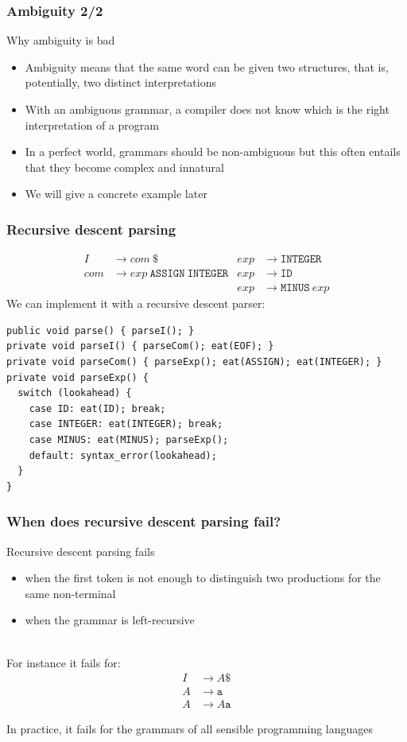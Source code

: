\documentclass[11pt]{beamer}  %
\begin{document}
\begin{frame}\frametitle{Ambiguity 2/2}

\begin{pinkbox}{Why ambiguity is bad}
\begin{itemize}
\item Ambiguity means that the same word can be given two structures, that is, potentially,
      two distinct interpretations
\item With an ambiguous grammar, a compiler does not know which is the right interpretation of a program
\item In a perfect world, grammars should be non-ambiguous but this often entails that they become
      complex and innatural
\item We will give a concrete example later
\end{itemize}
\end{pinkbox}

\end{frame}

\begin{frame}[fragile]\frametitle{Recursive descent parsing}
%
\begin{align*}
  \mathit{I}&\to\mathit{com}\ \mathtt{\$} & \mathit{exp}&\to\mathtt{INTEGER}\\
  \mathit{com}&\to\mathit{exp}\ \mathtt{ASSIGN}\ \mathtt{INTEGER} & \mathit{exp}&\to\mathtt{ID}\\
  && \mathit{exp}&\to\mathtt{MINUS}\ \mathit{exp}
\end{align*}
%
We can implement it with a recursive descent parser:
%
\begin{verbatim}
public void parse() { parseI(); }
private void parseI() { parseCom(); eat(EOF); }
private void parseCom() { parseExp(); eat(ASSIGN); eat(INTEGER); }
private void parseExp() {
  switch (lookahead) {
    case ID: eat(ID); break;
    case INTEGER: eat(INTEGER); break;
    case MINUS: eat(MINUS); parseExp();
    default: syntax_error(lookahead);
  }
}
\end{verbatim}
\end{frame}

\begin{frame}\frametitle{When does recursive descent parsing fail?}

Recursive descent parsing fails
%
\begin{itemize}
\item when the first token is not enough to distinguish two productions for the same non-terminal
\item when the grammar is left-recursive
\end{itemize}

\mbox{}\\

For instance it fails for:
%
\begin{align*}
I&\to A\mathtt{\$}\\
A&\to\mathtt{a}\\
A&\to A\mathtt{a}
\end{align*}

In practice, it fails for the grammars of all sensible programming languages

\end{frame}
\end{document}
